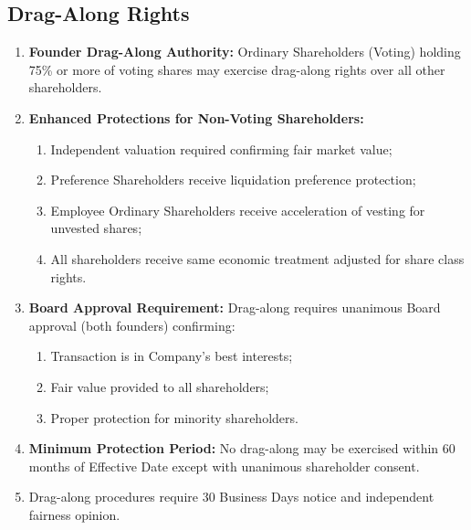 \subsection{Drag-Along Rights} \label{subsec:DragAlong}
\begin{enumerate}[label=(\alph*)]
\item \textbf{Founder Drag-Along Authority:} Ordinary Shareholders (Voting) holding 75\% or more of voting shares may exercise drag-along rights over all other shareholders.
\item \textbf{Enhanced Protections for Non-Voting Shareholders:}
    \begin{enumerate}[label=(\roman*)]
    \item Independent valuation required confirming fair market value;
    \item Preference Shareholders receive liquidation preference protection;
    \item Employee Ordinary Shareholders receive acceleration of vesting for unvested shares;
    \item All shareholders receive same economic treatment adjusted for share class rights.
    \end{enumerate}
\item \textbf{Board Approval Requirement:} Drag-along requires unanimous Board approval (both founders) confirming:
    \begin{enumerate}[label=(\roman*)]
    \item Transaction is in Company's best interests;
    \item Fair value provided to all shareholders;
    \item Proper protection for minority shareholders.
    \end{enumerate}
\item \textbf{Minimum Protection Period:} No drag-along may be exercised within 60 months of Effective Date except with unanimous shareholder consent.
\item Drag-along procedures require 30 Business Days notice and independent fairness opinion.
\end{enumerate}

